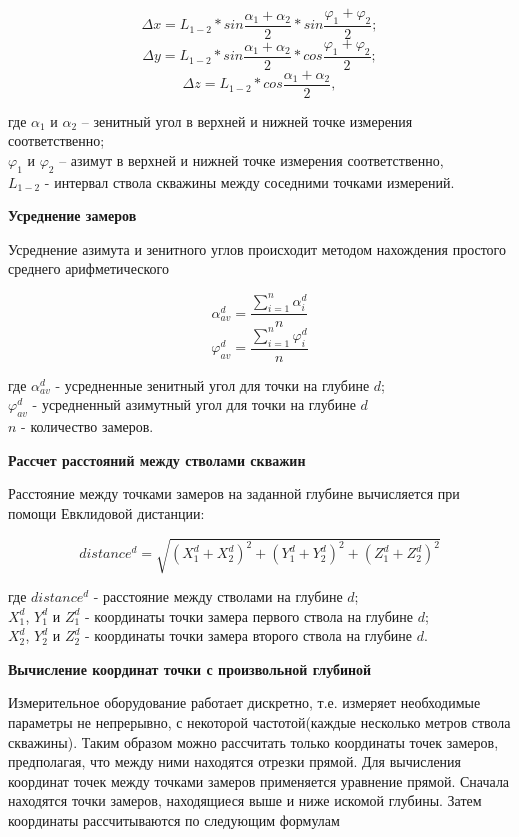 $$ \Delta x = L_{1-2} * sin \frac{\alpha_1 + \alpha_2}{2} * sin \frac{\varphi_1 + \varphi_2}{2}; $$
$$ \Delta y = L_{1-2} * sin \frac{\alpha_1 + \alpha_2}{2} * cos \frac{\varphi_1 + \varphi_2}{2}; $$
$$ \Delta z = L_{1-2} * cos \frac{\alpha_1 + \alpha_2}{2}, $$

где $ \alpha_1 $ и $ \alpha_2 $ – зенитный угол в верхней и нижней точке измерения соответственно;\\
$ \varphi_1 $ и $ \varphi_2 $ – азимут в верхней и нижней точке измерения соответственно,\\
$ L_{1-2} $ - интервал ствола скважины между соседними точками измерений.

\textbf{Усреднение замеров}

Усреднение азимута и зенитного углов происходит методом нахождения простого среднего арифметического

$$ \alpha_{av}^d = \frac{\sum\limits_{i=1}^{n} \alpha_i^d}{n} $$
$$ \varphi_{av}^d = \frac{\sum\limits_{i=1}^{n} \varphi_i^d}{n} $$

где $ \alpha_{av}^d $ - усредненные зенитный угол для точки на глубине $d$;\\
$ \varphi_{av}^d $ - усредненный азимутный угол для точки на глубине $d$\\
$ n $ - количество замеров.

\textbf{Рассчет расстояний между стволами скважин}

Расстояние между точками замеров на заданной глубине вычисляется при помощи Евклидовой дистанции:

$$ distance^d = \sqrt{(X_1^d + X_2^d)^2 + (Y_1^d + Y_2^d)^2 + (Z_1^d + Z_2^d)^2 } $$

где $ distance^d $ - расстояние между стволами на глубине $ d $;\\
$ X_1^d $, $ Y_1^d $ и $ Z_1^d $ - координаты точки замера первого ствола на глубине $ d $;\\
$ X_2^d $, $ Y_2^d $ и $ Z_2^d $ - координаты точки замера второго ствола на глубине $ d $.

\textbf{Вычисление координат точки с произвольной глубиной}

Измерительное оборудование работает дискретно, т.е. измеряет необходимые параметры не непрерывно, с некоторой частотой(каждые несколько метров
ствола скважины). Таким образом можно рассчитать только координаты точек замеров, предполагая, что между ними находятся отрезки прямой. Для вычисления
координат точек между точками замеров применяется уравнение прямой. Сначала находятся точки замеров, находящиеся выше и ниже искомой глубины. Затем
координаты рассчитываются по следующим формулам

